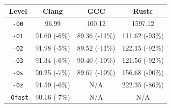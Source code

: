 \begin{tabular*}{\columnwidth}{@{\extracolsep\fill}cccc@{\extracolsep\fill}}
\toprule
\textbf{Level} & \textbf{Clang} & \textbf{GCC} & \textbf{Rustc} \\
\midrule
\texttt{-O0} & 96.99 & 100.12 & 1597.12 \\
\texttt{-O1} & 91.60 (-6\%) & 89.36 (-11\%) & 111.62 (-93\%) \\
\texttt{-O2} & 91.98 (-5\%) & 89.52 (-11\%) & 122.15 (-92\%) \\
\texttt{-O3} & 91.34 (-6\%) & 90.40 (-10\%) & 121.56 (-92\%) \\
\texttt{-Os} & 90.25 (-7\%) & 89.67 (-10\%) & 156.68 (-90\%) \\
\texttt{-Oz} & 91.59 (-6\%) & N/A & 222.35 (-86\%) \\
\texttt{-Ofast} & 90.16 (-7\%) & N/A & N/A \\
\bottomrule
\end{tabular*}
